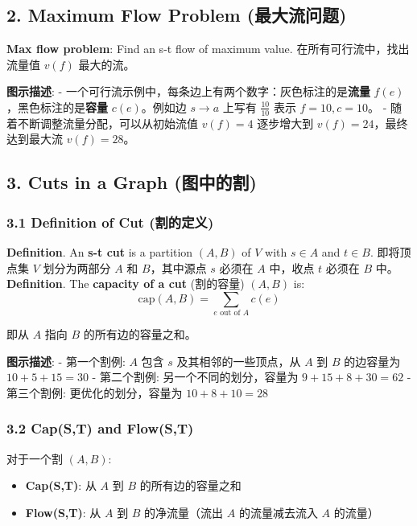 \documentclass[10pt,a4paper,openany]{ctexbook}
\theoremstyle{definition}
\theoremstyle{remark}
\renewenvironment{quote}
  {\list{}{\leftmargin=1em\rightmargin=0pt\topsep=0.5pt\partopsep=0pt}\item[]}
  {\endlist}
\begin{document}
\subsection{2. Maximum Flow Problem (最大流问题)}

\textbf{Max flow problem}: Find an s-t flow of maximum value.
在所有可行流中，找出流量值 $v(f)$ 最大的流。
\begin{quote}
\textbf{图示描述}:
- 一个可行流示例中，每条边上有两个数字：灰色标注的是\textbf{流量} $f(e)$，黑色标注的是\textbf{容量} $c(e)$。例如边 $s \to a$ 上写有 $\frac{10}{10}$ 表示 $f=10, c=10$。
- 随着不断调整流量分配，可以从初始流值 $v(f)=4$ 逐步增大到 $v(f)=24$，最终达到最大流 $v(f)=28$。

\end{quote}
\vspace{-2pt}

\subsection{3. Cuts in a Graph (图中的割)}

\subsubsection{3.1 Definition of Cut (割的定义)}

\textbf{Definition}. An \textbf{s-t cut} is a partition $(A, B)$ of $V$ with $s \in A$ and $t \in B$.
即将顶点集 $V$ 划分为两部分 $A$ 和 $B$，其中源点 $s$ 必须在 $A$ 中，收点 $t$ 必须在 $B$ 中。
\textbf{Definition}. The \textbf{capacity of a cut} (割的容量) $(A, B)$ is:
\[
\text{cap}(A, B) = \sum_{e \text{ out of } A} c(e)
\]

即从 $A$ 指向 $B$ 的所有边的容量之和。
\begin{quote}
\textbf{图示描述}:
- 第一个割例: $A$ 包含 $s$ 及其相邻的一些顶点，从 $A$ 到 $B$ 的边容量为 $10 + 5 + 15 = 30$
- 第二个割例: 另一个不同的划分，容量为 $9 + 15 + 8 + 30 = 62$
- 第三个割例: 更优化的划分，容量为 $10 + 8 + 10 = 28$

\end{quote}

\subsubsection{3.2 Cap(S,T) and Flow(S,T)}

对于一个割 $(A, B)$:
\begin{itemize}
\item \textbf{Cap(S,T)}: 从 $A$ 到 $B$ 的所有边的容量之和
\item \textbf{Flow(S,T)}: 从 $A$ 到 $B$ 的净流量（流出 $A$ 的流量减去流入 $A$ 的流量）

\end{itemize}
\end{document}
